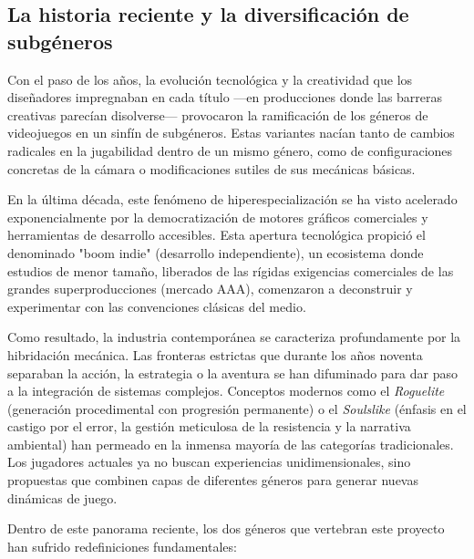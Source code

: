 \subsection{La historia reciente y la diversificación de subgéneros}

Con el paso de los años, la evolución tecnológica y la creatividad que los diseñadores impregnaban en cada título —en producciones donde las barreras creativas parecían disolverse— provocaron la ramificación de los géneros de videojuegos en un sinfín de subgéneros. Estas variantes nacían tanto de cambios radicales en la jugabilidad dentro de un mismo género, como de configuraciones concretas de la cámara o modificaciones sutiles de sus mecánicas básicas.

En la última década, este fenómeno de hiperespecialización se ha visto acelerado exponencialmente por la democratización de motores gráficos comerciales y herramientas de desarrollo accesibles. Esta apertura tecnológica propició el denominado "boom indie" (desarrollo independiente), un ecosistema donde estudios de menor tamaño, liberados de las rígidas exigencias comerciales de las grandes superproducciones (mercado AAA), comenzaron a deconstruir y experimentar con las convenciones clásicas del medio.

Como resultado, la industria contemporánea se caracteriza profundamente por la hibridación mecánica. Las fronteras estrictas que durante los años noventa separaban la acción, la estrategia o la aventura se han difuminado para dar paso a la integración de sistemas complejos. Conceptos modernos como el \textit{Roguelite} (generación procedimental con progresión permanente) o el \textit{Soulslike} (énfasis en el castigo por el error, la gestión meticulosa de la resistencia y la narrativa ambiental) han permeado en la inmensa mayoría de las categorías tradicionales. Los jugadores actuales ya no buscan experiencias unidimensionales, sino propuestas que combinen capas de diferentes géneros para generar nuevas dinámicas de juego.

Dentro de este panorama reciente, los dos géneros que vertebran este proyecto han sufrido redefiniciones fundamentales:

